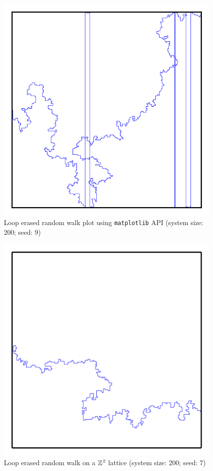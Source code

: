 \documentclass{article}
\begin{document}
\begin{figure}[H]
	\begin{center}
		\includegraphics[scale=1.6]{LERWw}
		\caption{Loop erased random walk plot using \texttt{matplotlib} API (system size: 200; seed: 9)}
		\label{fig:LERWw}
	\end{center}
\end{figure}

\begin{figure}[H]
	\begin{center}
		\includegraphics[scale=1.6]{LERW_200s7hdpi}
		\caption{Loop erased random walk on a $\mathbb{Z}^{\emph{2}}$ lattice (system size: 200; seed: 7)}
		\label{fig:LERW}
	\end{center}
\end{figure}
\end{document}
